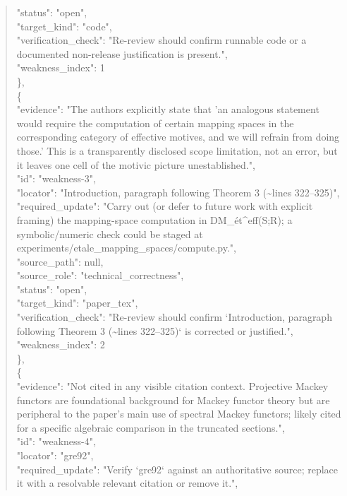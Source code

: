 \documentclass[11pt]{article}
\begin{document}
\begin{quote}
      "status": "open",\\
      "target\_kind": "code",\\
      "verification\_check": "Re-review should confirm runnable code or a documented non-release justification is present.",\\
      "weakness\_index": 1\\
    \},\\
    \{\\
      "evidence": "The authors explicitly state that 'an analogous statement would require the computation of certain mapping spaces in the corresponding category of effective motives, and we will refrain from doing those.' This is a transparently disclosed scope limitation, not an error, but it leaves one cell of the motivic picture unestablished.",\\
      "id": "weakness-3",\\
      "locator": "Introduction, paragraph following Theorem 3 (\~{}lines 322--325)",\\
      "required\_update": "Carry out (or defer to future work with explicit framing) the mapping-space computation in DM\_ét\^{}eff(S;R); a symbolic/numeric check could be staged at experiments/etale\_mapping\_spaces/compute.py.",\\
      "source\_path": null,\\
      "source\_role": "technical\_correctness",\\
      "status": "open",\\
      "target\_kind": "paper\_tex",\\
      "verification\_check": "Re-review should confirm `Introduction, paragraph following Theorem 3 (\~{}lines 322--325)` is corrected or justified.",\\
      "weakness\_index": 2\\
    \},\\
    \{\\
      "evidence": "Not cited in any visible citation context. Projective Mackey functors are foundational background for Mackey functor theory but are peripheral to the paper's main use of spectral Mackey functors; likely cited for a specific algebraic comparison in the truncated sections.",\\
      "id": "weakness-4",\\
      "locator": "gre92",\\
      "required\_update": "Verify `gre92` against an authoritative source; replace it with a resolvable relevant citation or remove it.",\\

\end{quote}
\end{document}

